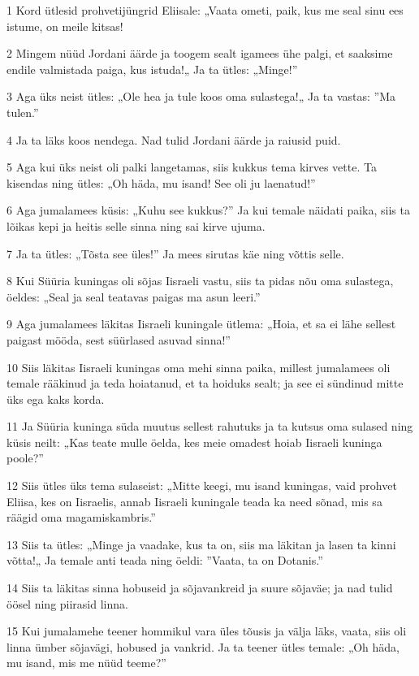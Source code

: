 \par 1 Kord ütlesid prohvetijüngrid Eliisale: „Vaata ometi, paik, kus me seal sinu ees istume, on meile kitsas!
\par 2 Mingem nüüd Jordani äärde ja toogem sealt igamees ühe palgi, et saaksime endile valmistada paiga, kus istuda!„ Ja ta ütles: „Minge!”
\par 3 Aga üks neist ütles: „Ole hea ja tule koos oma sulastega!„ Ja ta vastas: ”Ma tulen.”
\par 4 Ja ta läks koos nendega. Nad tulid Jordani äärde ja raiusid puid.
\par 5 Aga kui üks neist oli palki langetamas, siis kukkus tema kirves vette. Ta kisendas ning ütles: „Oh häda, mu isand! See oli ju laenatud!”
\par 6 Aga jumalamees küsis: „Kuhu see kukkus?” Ja kui temale näidati paika, siis ta lõikas kepi ja heitis selle sinna ning sai kirve ujuma.
\par 7 Ja ta ütles: „Tõsta see üles!” Ja mees sirutas käe ning võttis selle.
\par 8 Kui Süüria kuningas oli sõjas Iisraeli vastu, siis ta pidas nõu oma sulastega, öeldes: „Seal ja seal teatavas paigas ma asun leeri.”
\par 9 Aga jumalamees läkitas Iisraeli kuningale ütlema: „Hoia, et sa ei lähe sellest paigast mööda, sest süürlased asuvad sinna!”
\par 10 Siis läkitas Iisraeli kuningas oma mehi sinna paika, millest jumalamees oli temale rääkinud ja teda hoiatanud, et ta hoiduks sealt; ja see ei sündinud mitte üks ega kaks korda.
\par 11 Ja Süüria kuninga süda muutus sellest rahutuks ja ta kutsus oma sulased ning küsis neilt: „Kas teate mulle öelda, kes meie omadest hoiab Iisraeli kuninga poole?”
\par 12 Siis ütles üks tema sulaseist: „Mitte keegi, mu isand kuningas, vaid prohvet Eliisa, kes on Iisraelis, annab Iisraeli kuningale teada ka need sõnad, mis sa räägid oma magamiskambris.”
\par 13 Siis ta ütles: „Minge ja vaadake, kus ta on, siis ma läkitan ja lasen ta kinni võtta!„ Ja temale anti teada ning öeldi: ”Vaata, ta on Dotanis.”
\par 14 Siis ta läkitas sinna hobuseid ja sõjavankreid ja suure sõjaväe; ja nad tulid öösel ning piirasid linna.
\par 15 Kui jumalamehe teener hommikul vara üles tõusis ja välja läks, vaata, siis oli linna ümber sõjavägi, hobused ja vankrid. Ja ta teener ütles temale: „Oh häda, mu isand, mis me nüüd teeme?”
